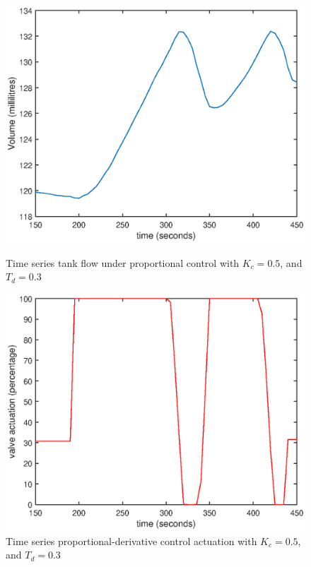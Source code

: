 \documentclass{article}
\begin{document}
\begin{figure}[h]
	\centering
	\begin{minipage}{0.45\textwidth}
		\centering
		\includegraphics[scale=0.4]{PD_Kc_05_Td_05}
		\caption{Time series tank flow under proportional control with $K_c = 0.5$, and $T_d = 0.3$}
	\end{minipage}
	\hspace{0.5cm}
	\begin{minipage}{0.45\textwidth}
		\centering
		\includegraphics[scale=0.4]{PD_Kc_05_Td_05_control}
		\caption{Time series proportional-derivative control actuation with $K_c = 0.5$, and $T_d = 0.3$}
	\end{minipage}
\end{figure}
\end{document}
